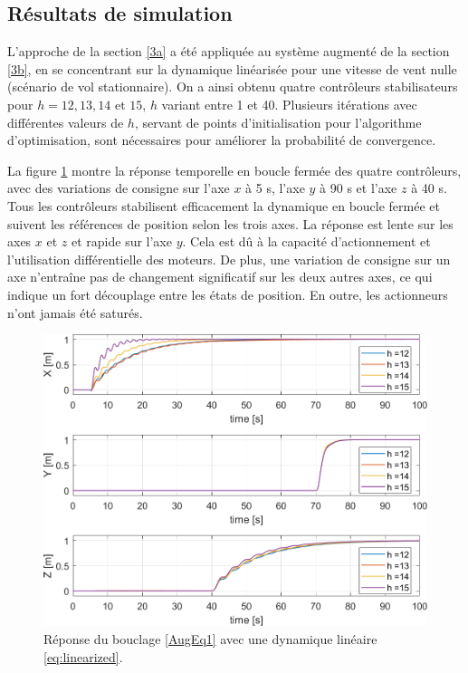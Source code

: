 \subsection{Résultats de simulation}

L'approche de la section \ref{3a} a été appliquée au système augmenté de la section \ref{3b}, en se concentrant sur la dynamique linéarisée pour une vitesse de vent nulle (scénario de vol stationnaire). On a ainsi obtenu quatre contrôleurs stabilisateurs pour $h=12, 13, 14 \text{ et } 15$, $h$ variant entre 1 et 40. Plusieurs itérations avec différentes valeurs de $h$, servant de points d'initialisation pour l'algorithme d'optimisation, sont nécessaires pour améliorer la probabilité de convergence.

La figure \ref{HKStepRes_a} montre la réponse temporelle en boucle fermée des quatre contrôleurs, avec des variations de consigne sur l'axe $x$ à 5 s, l'axe $y$ à 90 s et l'axe $z$ à 40 s. Tous les contrôleurs stabilisent efficacement la dynamique en boucle fermée et suivent les références de position selon les trois axes. La réponse est lente sur les axes $x$ et $z$ et rapide sur l'axe $y$. Cela est dû à la capacité d'actionnement et l'utilisation différentielle des moteurs. De plus, une variation de consigne sur un axe n'entraîne pas de changement significatif sur les deux autres axes, ce qui indique un fort découplage entre les états de position. En outre, les actionneurs n'ont jamais été saturés.


\begin{figure}[hbt]
    \centering
   \includegraphics[width=0.9\columnwidth]{figures/stepResponse.png}
    \caption{Réponse du bouclage \eqref{AugEq1} avec une dynamique linéaire \eqref{eq:linearized}.}
    \label{HKStepRes_a}
\end{figure}

